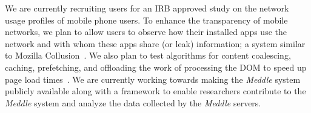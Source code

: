 \documentclass{sig-alternate}
\newcommand{\meddle}{{\em Meddle}\xspace}
\begin{document}
We are currently recruiting users for an IRB approved study on the
network usage profiles of mobile phone users. To enhance the
transparency of mobile networks, we plan to allow users to observe how
their installed apps use the network and with whom these apps share (or
leak) information; a system similar to Mozilla
Collusion~\cite{collusion}. 
We also plan to test algorithms for content coalescing, caching,
prefetching, and offloading the work of processing the DOM to speed up
page load times~\cite{opera-mini, silk, google-spdy}. We are currently
working towards making the \meddle system publicly available along
with a framework to enable researchers contribute to the \meddle
system and analyze the data collected by the \meddle servers.  

\begin{small}


\end{small}
\end{document}
